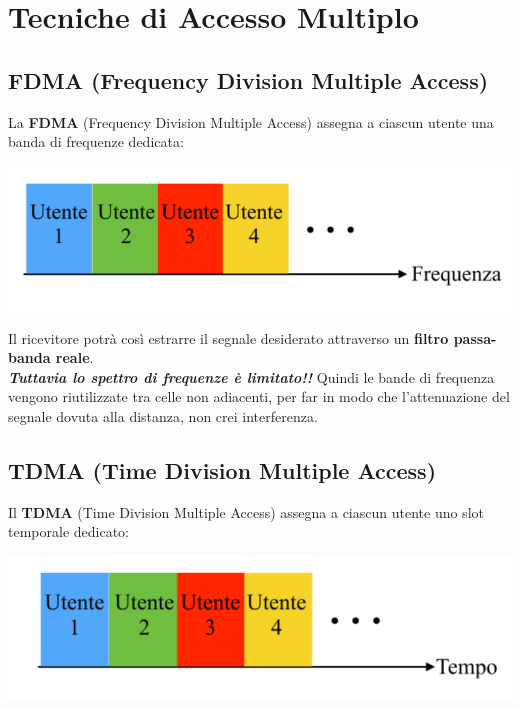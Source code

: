 \section{Tecniche di Accesso Multiplo}
\subsection{FDMA (Frequency Division Multiple Access)}
La \textbf{FDMA} (Frequency Division Multiple Access) assegna a ciascun utente una banda di frequenze dedicata:

\begin{center}
    \includegraphics[width=\textwidth]{Images/FDMA.png}
\end{center}

Il ricevitore potrà così estrarre il segnale desiderato attraverso un \textbf{filtro passa-banda reale}.\\

\textit{\textbf{Tuttavia lo spettro di frequenze è limitato!!}} Quindi le bande di frequenza vengono riutilizzate tra celle non adiacenti, per far in modo che l'attenuazione del segnale dovuta alla distanza, non crei interferenza.
\\

\subsection{TDMA (Time Division Multiple Access)}
Il \textbf{TDMA} (Time Division Multiple Access) assegna a ciascun utente uno slot temporale dedicato:

\begin{center}
    \includegraphics[width=\textwidth]{Images/TDMA.png}
\end{center}

